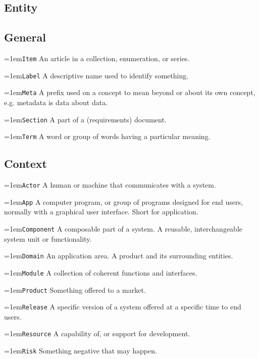 \documentclass[9pt,a4paper,oneside]{report}
\begin{document}
\begin{multicols*}{4}
    \section*{Entity}

\subsection*{General}

\hangindent=1em\lstinline+Item+  An article in a collection, enumeration, or series.

\hangindent=1em\lstinline+Label+ A descriptive name used to identify something.

\hangindent=1em\lstinline+Meta+ A prefix used on a concept to mean beyond or about its own concept, e.g. metadata is data about data.

\hangindent=1em\lstinline+Section+ A part of a (requirements) document.

\hangindent=1em\lstinline+Term+ A word or group of words having a particular meaning.

\subsection*{Context}

\hangindent=1em\lstinline+Actor+ A human or machine that communicates with a system.

\hangindent=1em\lstinline+App+ A computer program, or group of programs designed for end users, normally with a graphical user interface. Short for application.

\hangindent=1em\lstinline+Component+ A composable part of a system. A reusable, interchangeable system unit or functionality.

\hangindent=1em\lstinline+Domain+ An application area. A product and its surrounding entities.

\hangindent=1em\lstinline+Module+ A collection of coherent functions and interfaces.

\hangindent=1em\lstinline+Product+ Something offered to a market.

\hangindent=1em\lstinline+Release+ A specific version of a system offered at a specific time to end users.

\hangindent=1em\lstinline+Resource+ A capability of, or support for development.

\hangindent=1em\lstinline+Risk+ Something negative that may happen.


\end{multicols*}
\end{document}
